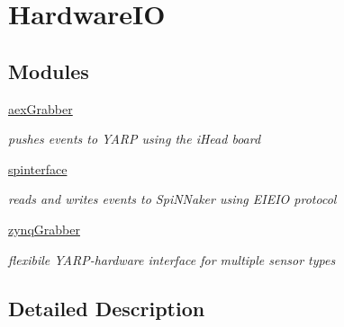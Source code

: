 \hypertarget{group__HardwareIO}{}\section{Hardware\+IO}
\label{group__HardwareIO}
\subsection*{Modules}
\begin{DoxyCompactItemize}
\item 
\hyperlink{group__aexGrabber}{aex\+Grabber}
\begin{DoxyCompactList}\small\item\em pushes events to Y\+A\+RP using the i\+Head board \end{DoxyCompactList}\item 
\hyperlink{group__spinterface}{spinterface}
\begin{DoxyCompactList}\small\item\em reads and writes events to Spi\+N\+Naker using E\+I\+E\+IO protocol \end{DoxyCompactList}\item 
\hyperlink{group__zynqGrabber}{zynq\+Grabber}
\begin{DoxyCompactList}\small\item\em flexibile Y\+A\+R\+P-\/hardware interface for multiple sensor types \end{DoxyCompactList}\end{DoxyCompactItemize}


\subsection{Detailed Description}
